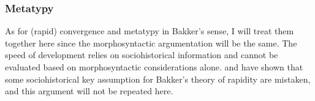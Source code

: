 % 
% 
% 





\subsubsection{Metatypy}
As for (rapid) convergence and metatypy in Bakker's sense, I will treat them together here since the morphosyntactic argumentation will be the same. The speed of development relies on sociohistorical information and cannot be evaluated based on morphosyntactic considerations alone. \citet{SmithEtAl2006cll} and \citet{Nordhoff2009} have shown that some sociohistorical key assumption for Bakker's theory of rapidity are mistaken, and this argument will not be repeated here.

